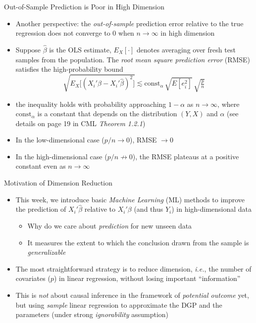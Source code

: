 \documentclass[aspectratio=1610,12pt,xcolor=dvipsnames]{beamer}
\begin{document}
\begin{frame}{Out-of-Sample Prediction is Poor in High Dimension}

\begin{itemize}
    \item Another perspective: the \textit{out-of-sample} prediction error relative to the true regression does not converge to 0 when $n \to \infty$ in high dimension \pause
    \item Suppose $\hat{\beta}$ is the OLS estimate, $E_X[\cdot]$ denotes averaging over fresh test samples from the population. The \textit{root mean square prediction error} (RMSE) satisfies the high-probability bound
    \[
    \sqrt{E_X\!\big[(X_i'\beta - X_i'\hat\beta)^2\big]}
    \lesssim\text{const}_{\alpha}\,\sqrt{E[e_i^2]}\,\sqrt{\tfrac{p}{n}}\,
    \]
    \item the inequality holds with probability approaching $1-\alpha$ as $n \rightarrow \infty$, where $\text{const}_{\alpha}$ is a constant that depends on the distribution $(Y,X)$ and $\alpha$ (see details on page 19 in \textcolor{nagivation}{CML} \textit{Theorem 1.2.1}) \pause
    \item In the low-dimensional case ($p/n \to 0$), RMSE $\to 0$
    \item In the high-dimensional case ($p/n \not\to 0$), the RMSE plateaus at a positive constant even as $n\rightarrow\infty$
\end{itemize}
\end{frame}


\begin{frame}{Motivation of Dimension Reduction}
\begin{itemize}
    \item This week, we introduce basic \textit{Machine Learning} (ML) methods to improve the prediction of $X_i'\hat{\beta}$ relative to $X_i'\beta$ (and thus $Y_i$) in high-dimensional data
    \begin{itemize}
        \item Why do we care about \textit{prediction} for new unseen data
        \item It measures the extent to which the conclusion drawn from the sample is \textit{generalizable}
    \end{itemize} \pause
    \item The most straightforward strategy is to reduce dimension, \textit{i.e.}, the number of covariates ($p$) in linear regression, without losing important ``information''
    \item This is \textit{not} about causal inference in the framework of \textit{potential outcome} yet, but using \textit{sample} linear regression to approximate the DGP and the parameters (under strong \textit{ignorability} assumption)
\end{itemize}
\end{frame}
\end{document}
